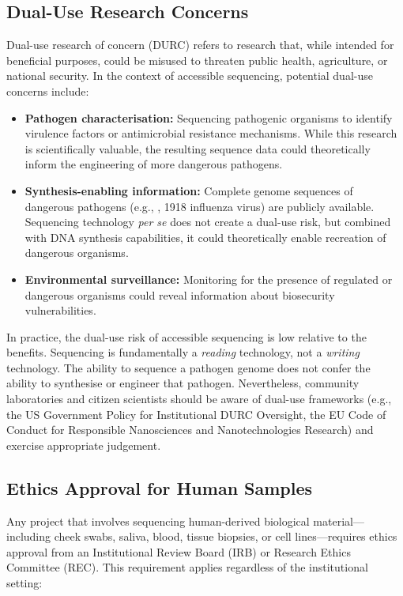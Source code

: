 \subsection{Dual-Use Research Concerns}
\label{subsec:accessible:dualuse}

Dual-use research of concern (DURC) refers to research that, while intended for beneficial purposes, could be misused to threaten public health, agriculture, or national security. In the context of accessible sequencing, potential dual-use concerns include:

\begin{itemize}[itemsep=2pt]
  \item \textbf{Pathogen characterisation:} Sequencing pathogenic organisms to identify virulence factors or antimicrobial resistance mechanisms. While this research is scientifically valuable, the resulting sequence data could theoretically inform the engineering of more dangerous pathogens.
  \item \textbf{Synthesis-enabling information:} Complete genome sequences of dangerous pathogens (e.g., , 1918 influenza virus) are publicly available. Sequencing technology \emph{per se} does not create a dual-use risk, but combined with DNA synthesis capabilities, it could theoretically enable recreation of dangerous organisms.
  \item \textbf{Environmental surveillance:} Monitoring for the presence of regulated or dangerous organisms could reveal information about biosecurity vulnerabilities.
\end{itemize}

In practice, the dual-use risk of accessible sequencing is low relative to the benefits. Sequencing is fundamentally a \emph{reading} technology, not a \emph{writing} technology. The ability to sequence a pathogen genome does not confer the ability to synthesise or engineer that pathogen. Nevertheless, community laboratories and citizen scientists should be aware of dual-use frameworks (e.g., the US Government Policy for Institutional DURC Oversight, the EU Code of Conduct for Responsible Nanosciences and Nanotechnologies Research) and exercise appropriate judgement.

\subsection{Ethics Approval for Human Samples}
\label{subsec:accessible:ethics}

Any project that involves sequencing human-derived biological material---including cheek swabs, saliva, blood, tissue biopsies, or cell lines---requires ethics approval from an Institutional Review Board (IRB) or Research Ethics Committee (REC). This requirement applies regardless of the institutional setting:

